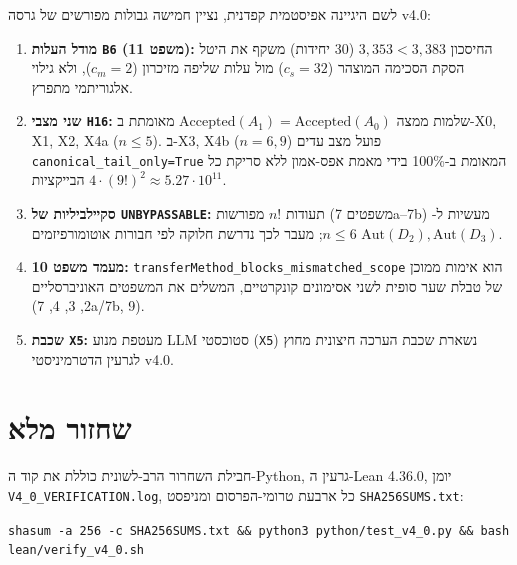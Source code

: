 \documentclass[10pt,a4paper]{article}
\newcommand{\code}[1]{\foreignlanguage{english}{\nolinkurl{#1}}}
\newcommand{\ltr}[1]{\foreignlanguage{english}{#1}}
\begin{document}
לשם היגיינה אפיסטמית קפדנית, נציין חמישה גבולות מפורשים של גרסה \ltr{v4.0}:
\begin{enumerate}
\item \textbf{מודל העלות \code{B6} (משפט 11):} החיסכון $3,353 < 3,383$ (30 יחידות) משקף את היטל הסקת הסכימה המוצהר ($c_s = 32$) מול עלות שליפה מזיכרון ($c_m = 2$), ולא גילוי אלגוריתמי מתפרץ.
\item \textbf{שני מצבי \code{H16}:} שלמות ממצה $\mathrm{Accepted}(A_1) = \mathrm{Accepted}(A_0)$ מאומתת ב-\ltr{X0, X1, X2, X4a} ($n \le 5$). ב-\ltr{X3, X4b} ($n=6,9$) פועל מצב עדים \code{canonical_tail_only=True} המאומת ב-100\% בידי מאמת אפס-אמון ללא סריקת כל $4\cdot(9!)^2 \approx 5.27\cdot 10^{11}$ הבייקציות.
\item \textbf{סקיילביליות של \code{UNBYPASSABLE}:} תעודות $n!$ מפורשות (משפטים \ltr{7a--7b}) מעשיות ל-$n \le 6$; מעבר לכך נדרשת חלוקה לפי חבורות אוטומורפיזמים $\mathrm{Aut}(D_2), \mathrm{Aut}(D_3)$.
\item \textbf{מעמד משפט 10:} \code{transferMethod_blocks_mismatched_scope} הוא אימות ממוכן של טבלת שער סופית לשני אסימונים קונקרטיים, המשלים את המשפטים האוניברסליים (2, 3, 4, \ltr{7a/7b}, 9).
\item \textbf{שכבת \code{X5}:} מעטפת מנוע \ltr{LLM} סטוכסטי (\code{X5}) נשארת שכבת הערכה חיצונית מחוץ לגרעין הדטרמיניסטי \ltr{v4.0}.
\end{enumerate}

\section{שחזור מלא}

חבילת השחרור הרב-לשונית כוללת את קוד ה-\ltr{Python}, גרעין ה-\ltr{Lean 4.36.0}, יומן \code{V4_0_VERIFICATION.log}, כל ארבעת טרומי-הפרסום ומניפסט \code{SHA256SUMS.txt}:
\begin{center}
\small\ltr{\texttt{shasum -a 256 -c SHA256SUMS.txt \&\& python3 python/test\_v4\_0.py \&\& bash lean/verify\_v4\_0.sh}}
\end{center}
\end{document}

